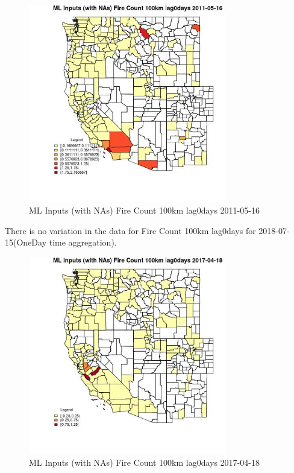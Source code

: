 \begin{figure} 
\centering  
\includegraphics[width=0.77\textwidth]{Code_Outputs/Report_ML_input_PM25_Step4_part_e_de_duplicated_aves_compiled_2019-05-21wNAs_CountyFire_Count_100km_lag0daysMean2011-05-16.jpg} 
\caption{\label{fig:Report_ML_input_PM25_Step4_part_e_de_duplicated_aves_compiled_2019-05-21wNAsCountyFire_Count_100km_lag0daysMean2011-05-16}ML Inputs (with NAs) Fire Count 100km lag0days 2011-05-16} 
\end{figure} 
 

There is no variation in the data for Fire Count 100km lag0days for 2018-07-15(OneDay time aggregation). 
 

\begin{figure} 
\centering  
\includegraphics[width=0.77\textwidth]{Code_Outputs/Report_ML_input_PM25_Step4_part_e_de_duplicated_aves_compiled_2019-05-21wNAs_CountyFire_Count_100km_lag0daysMean2017-04-18.jpg} 
\caption{\label{fig:Report_ML_input_PM25_Step4_part_e_de_duplicated_aves_compiled_2019-05-21wNAsCountyFire_Count_100km_lag0daysMean2017-04-18}ML Inputs (with NAs) Fire Count 100km lag0days 2017-04-18} 
\end{figure} 
 

